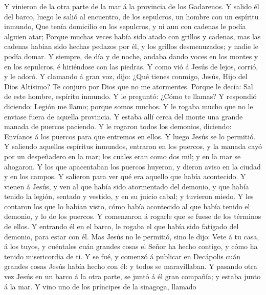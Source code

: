  Y vinieron de la otra parte de la mar á la provincia de
los Gadarenos.  Y salido él del barco, luego le salió al
encuentro, de los sepulcros, un hombre con un espíritu inmundo,
 Que tenía domicilio en los sepulcros, y ni aun con
cadenas le podía alguien atar;  Porque muchas veces había
sido atado con grillos y cadenas, mas las cadenas habían sido hechas
pedazos por él, y los grillos desmenuzados; y nadie le podía domar.
 Y siempre, de día y de noche, andaba dando voces en los
montes y en los sepulcros, é hiriéndose con las piedras. 
Y como vió á Jesús de lejos, corrió, y le adoró.  Y
clamando á gran voz, dijo: ¿Qué tienes conmigo, Jesús, Hijo del Dios
Altísimo? Te conjuro por Dios que no me atormentes. 
Porque le decía: Sal de este hombre, espíritu inmundo.  Y
le preguntó: ¿Cómo te llamas? Y respondió diciendo: Legión me llamo;
porque somos muchos.  Y le rogaba mucho que no le enviase
fuera de aquella provincia.  Y estaba allí cerca del
monte una grande manada de puercos paciendo.  Y le
rogaron todos los demonios, diciendo: Envíanos á los puercos para que
entremos en ellos.  Y luego Jesús se lo permitió. Y
saliendo aquellos espíritus inmundos, entraron en los puercos, y la
manada cayó por un despeñadero en la mar; los cuales eran como dos mil;
y en la mar se ahogaron.  Y los que apacentaban los
puercos huyeron, y dieron aviso en la ciudad y en los campos. Y salieron
para ver qué era aquello que había acontecido.  Y vienen
á Jesús, y ven al que había sido atormentado del demonio, y que había
tenido la legión, sentado y vestido, y en su juicio cabal; y tuvieron
miedo.  Y les contaron los que lo habían visto, cómo
había acontecido al que había tenido el demonio, y lo de los puercos.
 Y comenzaron á rogarle que se fuese de los términos de
ellos.  Y entrando él en el barco, le rogaba el que había
sido fatigado del demonio, para estar con él.  Mas Jesús
no le permitió, sino le dijo: Vete á tu casa, á los tuyos, y cuéntales
cuán grandes cosas el Señor ha hecho contigo, y cómo ha tenido
misericordia de ti.  Y se fué, y comenzó á publicar en
Decápolis cuán grandes cosas Jesús había hecho con él: y todos se
maravillaban.  Y pasando otra vez Jesús en un barco á la
otra parte, se juntó á él gran compañía; y estaba junto á la mar.
 Y vino uno de los príncipes de la sinagoga, llamado
